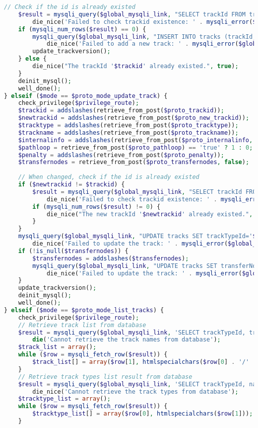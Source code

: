 \begin{lstlisting}[language=PHP,basicstyle=\tiny,caption=handle.php,label={lst:handle.php}]
	// Check if the id is already existed
	$result = mysqli_query($global_mysqli_link, "SELECT trackId FROM tracks WHERE trackId='$trackid'") or
		die_nice('Failed to check trackid existence: ' . mysqli_error($global_mysqli_link), true);
	if (mysqli_num_rows($result) == 0) {
		mysqli_query($global_mysqli_link, "INSERT INTO tracks (trackId, trackTypeId, trackName, penalty, internalInfo) VALUES ('$trackid','$tracktype','$trackname','$penalty','$internalinfo')") or
			die_nice('Failed to add a new track: ' . mysqli_error($global_mysqli_link), true);
		update_trackversion();
	} else {
		die_nice("The trackId '$trackid' already existed.", true);
	}
	deinit_mysql();
	well_done();
} elseif ($mode == $proto_mode_update_track) {
	check_privilege($privilege_route);
	$trackid = addslashes(retrieve_from_post($proto_trackid));
	$newtrackid = addslashes(retrieve_from_post($proto_new_trackid));
	$tracktype = addslashes(retrieve_from_post($proto_tracktype));
	$trackname = addslashes(retrieve_from_post($proto_trackname));
	$internalinfo = addslashes(retrieve_from_post($proto_internalinfo, false)) or $internalinfo = '';
	$pathloop = retrieve_from_post($proto_pathloop) == 'true' ? 1 : 0;
	$penalty = addslashes(retrieve_from_post($proto_penalty));
	$transfernodes = retrieve_from_post($proto_transfernodes, false);
	
	// When changed, check if the id is already existed
	if ($newtrackid != $trackid) {
		$result = mysqli_query($global_mysqli_link, "SELECT trackId FROM tracks WHERE trackId='$newtrackid'") or
			die_nice('Failed to check trackid existence: ' . mysqli_error($global_mysqli_link), true);
		if (mysqli_num_rows($result) != 0) {
			die_nice("The new trackId '$newtrackid' already existed.", true);
		}
	}
	mysqli_query($global_mysqli_link, "UPDATE tracks SET trackTypeId='$tracktype', trackId='$newtrackid', trackName='$trackname', internalInfo='$internalinfo', pathloop='$pathloop', penalty='$penalty' WHERE trackId='$trackid'") or
		die_nice('Failed to update the track: ' . mysqli_error($global_mysqli_link));
	if (!is_null($transfernodes)) {
		$transfernodes = addslashes($transfernodes);
		mysqli_query($global_mysqli_link, "UPDATE tracks SET transferNodes='$transfernodes'WHERE trackId='$trackid'") or
			die_nice('Failed to update the track: ' . mysqli_error($global_mysqli_link));
	}
	update_trackversion();
	deinit_mysql();
	well_done();
} elseif ($mode == $proto_mode_list_tracks) {
	check_privilege($privilege_route);
	// Retrieve track list from database
	$result = mysqli_query($global_mysqli_link, 'SELECT trackTypeId, trackId, trackName FROM tracks ORDER BY trackTypeId, trackId') or
		die('Cannot retrieve the track names from database');
	$track_list = array();	
	while ($row = mysqli_fetch_row($result)) {
		$track_list[] = array($row[1], htmlspecialchars($row[0] . '/' . $row[2]));
	}
	// Retrieve track types list result from database
	$result = mysqli_query($global_mysqli_link, 'SELECT trackTypeId, name FROM tracktypes ORDER BY trackTypeId') or
		die_nice('Cannot retrieve the track types from database');
	$tracktype_list = array();
	while ($row = mysqli_fetch_row($result)) {
		$tracktype_list[] = array($row[0], htmlspecialchars($row[1]));
	}
	

\end{lstlisting}
